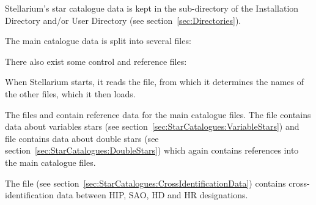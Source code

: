 Stellarium's star catalogue data is kept in the 
sub-directory of the Installation Directory and/or User Directory (see
section~\ref{sec:Directories}).

The main catalogue data is split into several files:

\begin{description}
\item[]
\item[]
\item[]
\item[]
\item[]
\item[]
\item[]
\item[]
\item[]
\end{description}

There also exist some control and reference files:

\begin{description}
\item[]
\item[]
\item[]
\item[]
\item[]
\item[]
\item[]
\end{description}

When Stellarium starts, it reads the  file, from which it
determines the names of the other files, which it then loads.

The files  and 
contain reference data for the main catalogue files. The
file  contains data about variables stars
(see section~\ref{sec:StarCatalogues:VariableStars}) and file  
contains data about double stars (see section~\ref{sec:StarCatalogues:DoubleStars}) 
which again contains references into the main catalogue files.

The file  (see section~\ref{sec:StarCatalogues:CrossIdentificationData}) contains cross-identification data between HIP, SAO, HD and HR designations.

